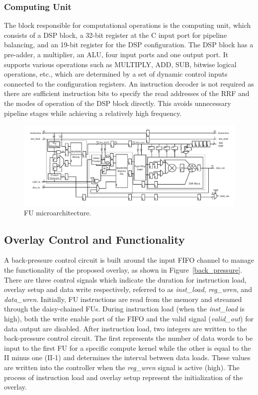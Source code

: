 \subsubsection{Computing Unit}
The block responsible for computational operations is the computing unit, which consists of a DSP block, a 32-bit register at the C input port for pipeline balancing, and an 19-bit register for the DSP configuration. 
The DSP block has a pre-adder, a multiplier, an ALU, four input ports and one output port. 
It supports various operations such as MULTIPLY, ADD, SUB, bitwise logical operations, etc., which are determined by a set of dynamic control inputs connected to the configuration registers. 
An instruction decoder is not required as there are sufficient instruction bits to specify the read addresses of the RRF and the modes of operation of the DSP block directly. This avoids unnecessary pipeline stages while achieving a relatively high frequency. 

\begin{figure}
	\centering
	\includegraphics[width=\linewidth]{Figures/FU_WB.pdf}
	\caption{FU microarchitecture.}
	\label{fu_wb}
\end{figure}

\subsection{Overlay Control and Functionality}
A back-pressure control circuit is built around the input FIFO channel to manage the functionality of the proposed overlay, as shown in Figure~\ref{back_pressure}. 
There are three control signals which indicate the duration for instruction load, overlay setup and data write respectively, referred to as \textit{inst\_load}, \textit{reg\_wren}, and \textit{data\_wren}. 
Initially, FU instructions are read from the memory and streamed through the daisy-chained FUs. During instruction load (when the \textit{inst\_load} is high), both the write enable port of the FIFO and the valid signal (\textit{valid\_out}) for data output are disabled. 
After instruction load, two integers are written to the back-pressure control circuit. The first represents the number of data words to be input to the first FU for a specific compute kernel while the other is equal to the II minus one (II-1) and determines the interval between data loads. These values are written into the controller when the \textit{reg\_wren} signal is active (high). 
The process of instruction load and overlay setup represent the initialization of the overlay.
	
